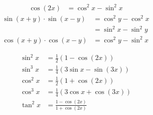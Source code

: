 \begin{multicols}{2}
\begin{proofhelp}[Additionstheoreme]
\begin{align*}
				\cos \left( 2x \right) &= \cos^2 x - \sin^2 x 
			\end{align*}
			\begin{align*}
				\sin \left( x + y \right) \cdot \sin \left( x - y \right) &= \cos^2 y - \cos^2 x \\
							&= \sin^2 x - \sin^2 y \\
				\cos \left( x + y \right) \cdot \cos \left( x - y \right) &= \cos^2 y - \sin^2 x
			\end{align*}
		\end{proofhelp}
		\begin{proofhelp}[Potenzen]
			\begin{align*}
				\sin^2 x &= \frac{1}{2} \left( 1 - \cos \left( 2x \right) \right) \\
				\sin^3 x &= \frac{1}{4} \left( 3 \sin x - \sin \left( 3x \right) \right) \\
				\cos^2 x &= \frac{1}{2} \left( 1 + \cos \left( 2x \right)\right) \\
				\cos^3 x &= \frac{1}{4} \left( 3 \cos x + \cos \left( 3x \right)\right) \\
				\tan^2 x &= \frac{1 - \cos \left( 2x \right)}{1 + \cos \left( 2x \right)}
			\end{align*}
		\end{proofhelp}
	\end{multicols}